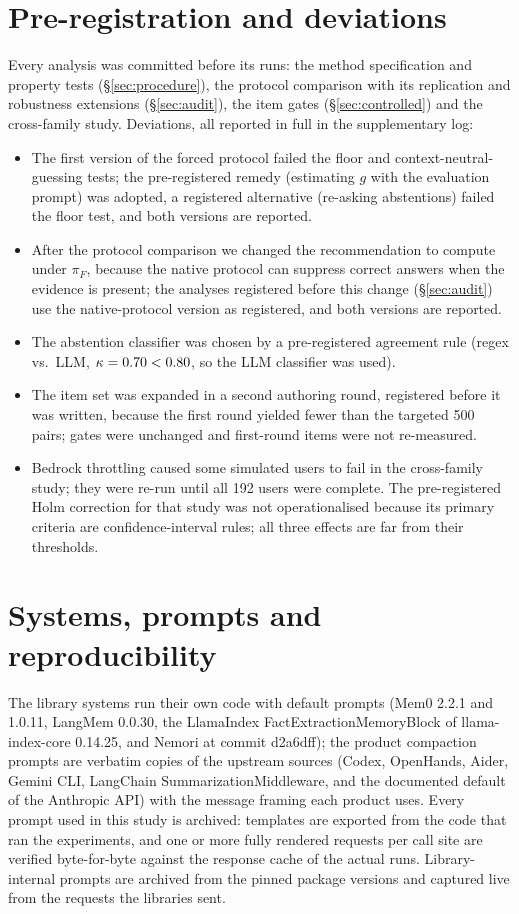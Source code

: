 \section{Pre-registration and deviations}
\label{app:deviations}

Every analysis was committed before its runs: the method specification and property tests (\S\ref{sec:procedure}),
the protocol comparison with its replication and robustness extensions (\S\ref{sec:audit}), the item gates
(\S\ref{sec:controlled}) and the cross-family study. Deviations, all reported in full in the supplementary log:
\begin{itemize}
\item The first version of the forced protocol failed the floor and context-neutral-guessing tests; the pre-registered
remedy (estimating $g$ with the evaluation prompt) was adopted, a registered alternative (re-asking abstentions) failed
the floor test, and both versions are reported.
\item After the protocol comparison we changed the recommendation to compute \cpr{} under $\pi_F$, because the native
protocol can suppress correct answers when the evidence is present; the analyses registered before this change
(\S\ref{sec:audit}) use the native-protocol version as registered, and both versions are reported.
\item The abstention classifier was chosen by a pre-registered agreement rule (regex vs.\ LLM, $\kappa=0.70<0.80$,
so the LLM classifier was used).
\item The item set was expanded in a second authoring round, registered before it was written, because the first round
yielded fewer than the targeted 500 pairs; gates were unchanged and first-round items were not re-measured.
\item Bedrock throttling caused some simulated users to fail in the cross-family study; they were re-run until all 192
users were complete. The pre-registered Holm correction for that study was not operationalised because its primary
criteria are confidence-interval rules; all three effects are far from their thresholds.
\end{itemize}

\section{Systems, prompts and reproducibility}
The library systems run their own code with default prompts (Mem0 2.2.1 and 1.0.11, LangMem 0.0.30, the LlamaIndex
FactExtractionMemoryBlock of llama-index-core 0.14.25, and Nemori at commit d2a6dff); the product compaction prompts are verbatim copies of the upstream sources (Codex,
OpenHands, Aider, Gemini CLI, LangChain SummarizationMiddleware, and the documented default of the Anthropic API) with
the message framing each product uses. Every prompt used in this study is archived: templates are exported from the code
that ran the experiments, and one or more fully rendered requests per call site are verified byte-for-byte against the
response cache of the actual runs. Library-internal prompts are archived from the pinned package versions and captured
live from the requests the libraries sent.


